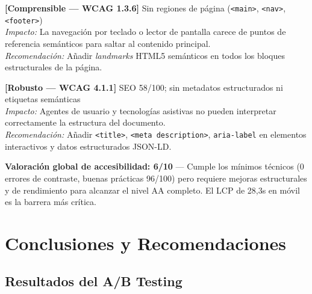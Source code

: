 \documentclass[11pt,a4paper]{article}
\begin{document}
\medskip
\noindent\textbf{[Comprensible — WCAG 1.3.6]}\enspace
Sin regiones de página (\texttt{<main>}, \texttt{<nav>}, \texttt{<footer>})\\
\textit{Impacto:} La navegación por teclado o lector de pantalla carece de puntos de
referencia semánticos para saltar al contenido principal.\\
\textit{Recomendación:} Añadir \textit{landmarks} HTML5 semánticos en todos los
bloques estructurales de la página.

\medskip
\noindent\textbf{[Robusto — WCAG 4.1.1]}\enspace
SEO 58/100; sin metadatos estructurados ni etiquetas semánticas\\
\textit{Impacto:} Agentes de usuario y tecnologías asistivas no pueden interpretar
correctamente la estructura del documento.\\
\textit{Recomendación:} Añadir \texttt{<title>}, \texttt{<meta description>},
\texttt{aria-label} en elementos interactivos y datos estructurados JSON-LD.

\begin{infobox}
\textbf{Valoración global de accesibilidad: 6/10} — Cumple los mínimos técnicos
(0 errores de contraste, buenas prácticas 96/100) pero requiere mejoras estructurales
y de rendimiento para alcanzar el nivel AA completo. El LCP de 28,3s en móvil
es la barrera más crítica.
\end{infobox}

\section{Conclusiones y Recomendaciones}

\subsection{Resultados del A/B Testing}
\end{document}
